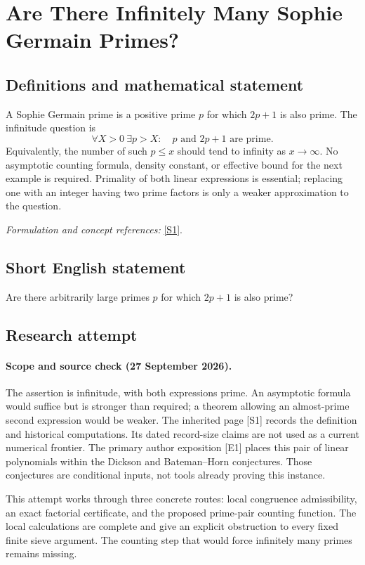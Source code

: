 \documentclass[11pt]{article}
\begin{document}
\section*{\texorpdfstring{Are There Infinitely Many Sophie Germain Primes?}{Are There Infinitely Many Sophie Germain Primes?}}\label{statement}
\subsection{Definitions and mathematical statement}
A Sophie Germain prime is a positive prime $p$ for which $2p+1$ is also prime. The infinitude question is
\[
 \forall X>0\ \exists p>X:\quad p\text{ and }2p+1\text{ are prime}.
\]
Equivalently, the number of such $p\le x$ should tend to infinity as $x\to\infty$. No asymptotic counting formula, density constant, or effective bound for the next example is required. Primality of both linear expressions is essential; replacing one with an integer having two prime factors is only a weaker approximation to the question.
\par\smallskip\textit{Formulation and concept references:} \href{https://mathworld.wolfram.com/SophieGermainPrime.html}{[S1]}.

\subsection{Short English statement}
Are there arbitrarily large primes $p$ for which $2p+1$ is also prime?
\subsection{Research attempt}
\paragraph{Scope and source check (27 September 2026).}
The assertion is infinitude, with both expressions prime. An asymptotic formula would suffice but is stronger than required; a theorem allowing an almost-prime second expression would be weaker. The inherited page [S1] records the definition and historical computations. Its dated record-size claims are not used as a current numerical frontier. The primary author exposition [E1] places this pair of linear polynomials within the Dickson and Bateman--Horn conjectures. Those conjectures are conditional inputs, not tools already proving this instance.

This attempt works through three concrete routes: local congruence admissibility, an exact factorial certificate, and the proposed prime-pair counting function. The local calculations are complete and give an explicit obstruction to every fixed finite sieve argument. The counting step that would force infinitely many primes remains missing.
\end{document}
